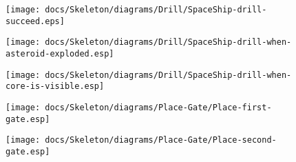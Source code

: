 \begin{figure}[H] 
    \centering 
    \texttt{[image: docs/Skeleton/diagrams/Drill/SpaceShip-drill-succeed.eps]} 
    \caption{} 
\end{figure} 

\begin{figure}[H] 
    \centering 
    \texttt{[image: docs/Skeleton/diagrams/Drill/SpaceShip-drill-when-asteroid-exploded.esp]} 
    \caption{} 
\end{figure} 

\begin{figure}[H] 
    \centering 
    \texttt{[image: docs/Skeleton/diagrams/Drill/SpaceShip-drill-when-core-is-visible.esp]} 
    \caption{} 
\end{figure} 


\begin{figure}[H] 
    \centering 
    \texttt{[image: docs/Skeleton/diagrams/Place-Gate/Place-first-gate.esp]} 
    \caption{} 
\end{figure} 

\begin{figure}[H] 
    \centering 
    \texttt{[image: docs/Skeleton/diagrams/Place-Gate/Place-second-gate.esp]} 
    \caption{} 
\end{figure} 